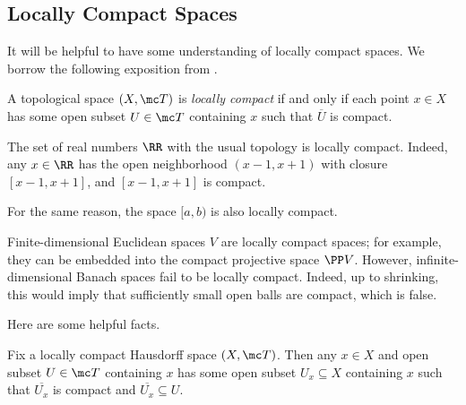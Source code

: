 \documentclass[../notes.tex]{subfiles}
\begin{document}
\subsection{Locally Compact Spaces}
It will be helpful to have some understanding of locally compact spaces. We borrow the following exposition from \cite[subsection~4.8.1]{elber-top}.
\begin{definition}
	A topological space $(X,\mc T)$ is \textit{locally compact} if and only if each point $x\in X$ has some open subset $U\in\mc T$ containing $x$ such that $\overline U$ is compact.
\end{definition}
\begin{example}
	The set of real numbers $\RR$ with the usual topology is locally compact. Indeed, any $x\in\RR$ has the open neighborhood $(x-1,x+1)$ with closure $[x-1,x+1]$, and $[x-1,x+1]$ is compact.
\end{example}
\begin{example}
	For the same reason, the space $[a,b)$ is also locally compact.
\end{example}
\begin{example}
	Finite-dimensional Euclidean spaces $V$ are locally compact spaces; for example, they can be embedded into the compact projective space $\PP V$. However, infinite-dimensional Banach spaces fail to be locally compact. Indeed, up to shrinking, this would imply that sufficiently small open balls are compact, which is false.
\end{example}
Here are some helpful facts.
\begin{lemma} \label{lem:better-loc-compact}
	Fix a locally compact Hausdorff space $(X,\mc T)$. Then any $x\in X$ and open subset $U\in\mc T$ containing $x$ has some open subset $U_x\subseteq X$ containing $x$ such that $\overline{U_x}$ is compact and $\overline{U_x}\subseteq U$.
\end{lemma}
\end{document}
